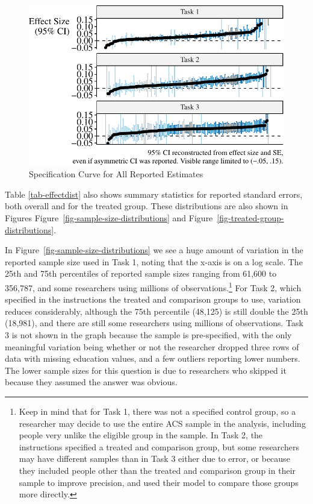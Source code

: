 \documentclass[
  letterpaper,
  DIV=11,
  numbers=noendperiod]{scrartcl}
\begin{document}
\begin{figure}

{\centering \includegraphics{The-Sources-of-Researcher-Variation-in-Economics_files/figure-pdf/fig-full-effect-distribution-1.pdf}

}

\caption{\label{fig-full-effect-distribution}Specification Curve for All
Reported Estimates}

\end{figure}

Table \ref{tab-effectdist} also shows summary statistics for reported
standard errors, both overall and for the treated group. These
distributions are also shown in Figures
Figure~\ref{fig-sample-size-distributions} and
Figure~\ref{fig-treated-group-distributions}.

In Figure~\ref{fig-sample-size-distributions} we see a huge amount of
variation in the reported sample size used in Task 1, noting that the
x-axis is on a log scale. The 25th and 75th percentiles of reported
sample sizes ranging from 61,600 to 356,787, and some researchers using
millions of observations.\footnote{Keep in mind that for Task 1, there
  was not a specified control group, so a researcher may decide to use
  the entire ACS sample in the analysis, including people very unlike
  the eligible group in the sample. In Task 2, the instructions
  specified a treated and comparison group, but some researchers may
  have different samples than in Task 3 either due to error, or because
  they included people other than the treated and comparison group in
  their sample to improve precision, and used their model to compare
  those groups more directly.} For Task 2, which specified in the
instructions the treated and comparison groups to use, variation reduces
considerably, although the 75th percentile (48,125) is still double the
25th (18,981), and there are still some researchers using millions of
observations. Task 3 is not shown in the graph because the sample is
pre-specified, with the only meaningful variation being whether or not
the researcher dropped three rows of data with missing education values,
and a few outliers reporting lower numbers. The lower sample sizes for
this question is due to researchers who skipped it because they assumed
the answer was obvious.
\end{document}
